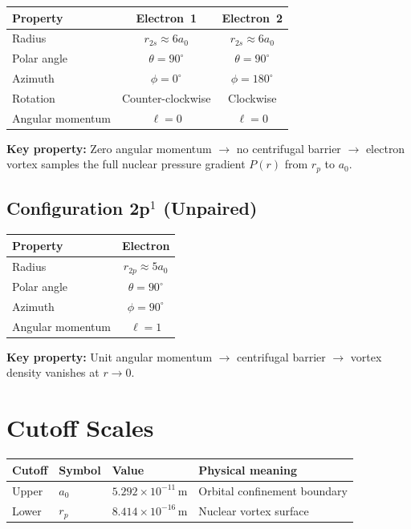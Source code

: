 \begin{center}
\begin{tabular}{lcc}
\hline
Property & Electron~1 & Electron~2 \\
\hline
Radius & $r_{2s} \approx 6a_0$ & $r_{2s} \approx 6a_0$ \\
Polar angle & $\theta = 90^\circ$ & $\theta = 90^\circ$ \\
Azimuth & $\phi = 0^\circ$ & $\phi = 180^\circ$ \\
Rotation & Counter-clockwise & Clockwise \\
Angular momentum & $\ell = 0$ & $\ell = 0$ \\
\hline
\end{tabular}
\end{center}

\noindent\textbf{Key property:} Zero angular momentum $\to$ no centrifugal barrier $\to$ electron vortex samples the full nuclear pressure gradient $P(r)$ from $r_p$ to $a_0$.

\subsection{Configuration 2p$^1$ (Unpaired)}

\begin{center}
\begin{tabular}{lc}
\hline
Property & Electron \\
\hline
Radius & $r_{2p} \approx 5a_0$ \\
Polar angle & $\theta = 90^\circ$ \\
Azimuth & $\phi = 90^\circ$ \\
Angular momentum & $\ell = 1$ \\
\hline
\end{tabular}
\end{center}

\noindent\textbf{Key property:} Unit angular momentum $\to$ centrifugal barrier $\to$ vortex density vanishes at $r \to 0$.


\section{Cutoff Scales}

\begin{center}
\begin{tabular}{llll}
\hline
\textbf{Cutoff} & \textbf{Symbol} & \textbf{Value} & \textbf{Physical meaning} \\
\hline
Upper & $a_0$ & $5.292 \times 10^{-11}$\,m & Orbital confinement boundary \\
Lower & $r_p$ & $8.414 \times 10^{-16}$\,m & Nuclear vortex surface \\
\hline
\end{tabular}
\end{center}


